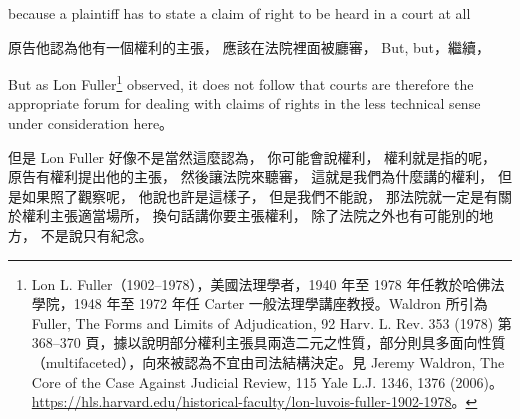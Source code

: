 \hypertarget{w06:cue:2241}{}because a plaintiff has to state a claim of right to be heard in a court at all

\hypertarget{w06:cue:2242}{}原告他認為他有一個權利的主張，
\hypertarget{w06:cue:2243}{}應該在法院裡面被廳審，
\hypertarget{w06:cue:2244}{}But, but，繼續，

\hypertarget{w06:cue:2245}{}But as Lon Fuller\footnote{Lon L. Fuller（1902–1978），美國法理學者，1940 年至 1978 年任教於哈佛法學院，1948 年至 1972 年任 Carter 一般法理學講座教授。Waldron 所引為 Fuller, The Forms and Limits of Adjudication, 92 Harv. L. Rev. 353 (1978) 第 368–370 頁，據以說明部分權利主張具兩造二元之性質，部分則具多面向性質（multifaceted），向來被認為不宜由司法結構決定。見 Jeremy Waldron, The Core of the Case Against Judicial Review, 115 Yale L.J. 1346, 1376 (2006)。\url{https://hls.harvard.edu/historical-faculty/lon-luvois-fuller-1902-1978}。} observed, it does not follow that courts are therefore the appropriate forum for dealing with claims of rights in the less technical sense under consideration here。

\hypertarget{w06:cue:2246}{}但是 Lon Fuller 好像不是當然這麼認為，
\hypertarget{w06:cue:2247}{}你可能會說權利，
\hypertarget{w06:cue:2248}{}權利就是指的呢，
\hypertarget{w06:cue:2249}{}原告有權利提出他的主張，
\hypertarget{w06:cue:2250}{}然後讓法院來聽審，
\hypertarget{w06:cue:2251}{}這就是我們為什麼講的權利，
\hypertarget{w06:cue:2252}{}但是如果照了觀察呢，
\hypertarget{w06:cue:2253}{}他說也許是這樣子，
\hypertarget{w06:cue:2254}{}但是我們不能說，
\hypertarget{w06:cue:2255}{}那法院就一定是有關於權利主張適當場所，
\hypertarget{w06:cue:2256}{}換句話講你要主張權利，
\hypertarget{w06:cue:2257}{}除了法院之外也有可能別的地方，
\hypertarget{w06:cue:2258}{}不是說只有紀念。

